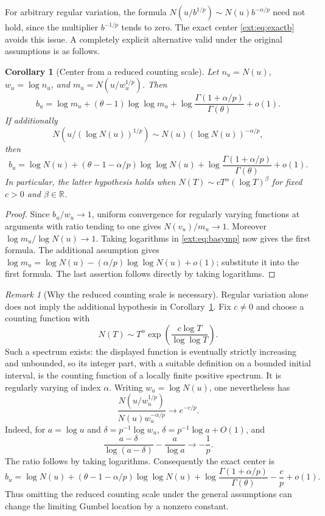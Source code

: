 \documentclass[11pt]{article}
\newtheorem{corollary}[theorem]{Corollary}
\theoremstyle{definition}
\theoremstyle{remark}
\newtheorem{remark}[theorem]{Remark}
\begin{document}
For arbitrary regular variation, the formula
$N(u/b^{1/p})\sim N(u)b^{-\alpha/p}$ need not hold, since the
multiplier $b^{-1/p}$ tends to zero.  The exact center
\eqref{ext:eq:exactb} avoids this issue.  A completely explicit
alternative valid under the original assumptions is as follows.

\begin{corollary}[Center from a reduced counting scale]\label{ext:cor:center}
Let $n_u=N(u)$, $w_u=\log n_u$, and
$m_u=N(u/w_u^{1/p})$.  Then
\[
 b_u=\log m_u+(\theta-1)\log\log m_u
       +\log\frac{\Gamma(1+\alpha/p)}{\Gamma(\theta)}+o(1).
\]
If additionally
\[
 N(u/(\log N(u))^{1/p})
       \sim N(u)(\log N(u))^{-\alpha/p},
\]
then
\begin{equation}\label{ext:eq:elementaryb}
 b_u=\log N(u)+(\theta-1-\alpha/p)\log\log N(u)
       +\log\frac{\Gamma(1+\alpha/p)}{\Gamma(\theta)}+o(1).
\end{equation}
In particular, the latter hypothesis holds when
$N(T)\sim cT^\alpha(\log T)^\beta$ for fixed $c>0$ and $\beta\in\mathbb R$.
\end{corollary}

\begin{proof}
Since $b_u/w_u\to1$, uniform convergence for regularly varying functions
at arguments with ratio tending to one gives
$N(v_u)/m_u\to1$.  Moreover
$\log m_u/\log N(u)\to1$.
Taking logarithms in \eqref{ext:eq:basymp} now gives the first formula.
The additional assumption gives
$\log m_u=\log N(u)-(\alpha/p)\log\log N(u)+o(1)$;
substitute it into the first formula.  The last assertion follows
directly by taking logarithms.
\end{proof}

\begin{remark}[Why the reduced counting scale is necessary]
\label{ext:rem:slowcount}
Regular variation alone does not imply the additional hypothesis in
Corollary~\ref{ext:cor:center}.  Fix $c\ne0$ and choose a counting
function with
\[
 N(T)\sim T^\alpha
       \exp\!\left(\frac{c\log T}{\log\log T}\right).
\]
Such a spectrum exists: the displayed function is eventually strictly
increasing and unbounded, so its integer part, with a suitable definition
on a bounded initial interval, is the counting function of a locally
finite positive spectrum.  It is regularly varying of index $\alpha$.
Writing $w_u=\log N(u)$, one nevertheless has
\[
 \frac{N(u/w_u^{1/p})}{N(u)w_u^{-\alpha/p}}
       \longrightarrow e^{-c/p}.
\]
Indeed, for $a=\log u$ and $\delta=p^{-1}\log w_u$,
$\delta=p^{-1}\log a+O(1)$, and
\[
 \frac{a-\delta}{\log(a-\delta)}-\frac a{\log a}
       \longrightarrow-\frac1p.
\]
The ratio follows by taking logarithms.  Consequently the exact center is
\[
 b_u=\log N(u)+(\theta-1-\alpha/p)\log\log N(u)
       +\log\frac{\Gamma(1+\alpha/p)}{\Gamma(\theta)}
       -\frac cp+o(1).
\]
Thus omitting the reduced counting scale under the general assumptions
can change the limiting Gumbel location by a nonzero constant.
\end{remark}
\end{document}
